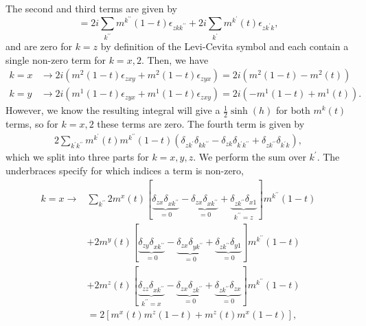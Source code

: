 \noindent The second and third terms are given by
\begin{equation*}
    =  2i\sum_{k^{\prime\prime}} m^{k^{\prime\prime}}(1-t)\epsilon_{zk k^{\prime\prime}} + 2i\sum_{k^{\prime}}  m^{k^{\prime}}(t)\epsilon_{zk^{\prime}k},
\end{equation*}
and are zero for $k=z$ by definition of the Levi-Cevita symbol and each contain a single non-zero term for $k=x,2$. Then, we have
\begin{align*}
    k=x & \rightarrow 2i\left( m^2(1-t)\epsilon_{zxy} + m^2(1-t)\epsilon_{zyx}\right) = 2i\left( m^2(1-t) - m^2(t)\right)\\
    k=y & \rightarrow 2i\left( m^1(1-t)\epsilon_{zyx} + m^1(1-t)\epsilon_{zxy}\right) = 2i\left( -m^1(1-t) + m^1(t)\right).
\end{align*}
However, we know the resulting integral will give a $\frac{1}{2}\sinh(h)$ for both $m^k(t)$ terms, so for $k=x,2$ these terms are zero.\newline
The fourth term is given by
\begin{align*}
    2\sum_{k^{\prime}k^{\prime\prime}} m^{k^{\prime}}(t) m^{k^{\prime\prime}}(1-t) (\delta_{zk^{\prime}}\delta_{kk^{\prime\prime}} - \delta_{zk}\delta_{k^{\prime}k^{\prime\prime}} + \delta_{zk^{\prime\prime}}\delta_{k^{\prime}k}),
\end{align*}
which we split into three parts for $k=x,y,z$. We perform the sum over $k^{\prime}$. The underbraces specify for which indices a term is non-zero,
\begin{align*}
    k=x \rightarrow  &\sum_{k^{\prime\prime}} 2m^{x}(t)[
    \underbrace{\delta_{zx}\delta_{xk^{\prime\prime}}}_{=0} - 
    \underbrace{\delta_{zx}\delta_{xk^{\prime\prime}}}_{=0} + 
    \underbrace{\delta_{zk^{\prime\prime}}\delta_{x1}}_{k^{\prime\prime}=z} ] m^{k^{\prime\prime}}(1-t) \\
    &+ 2m^{y}(t)[
    \underbrace{\delta_{zy}\delta_{xk^{\prime\prime}}}_{=0} - 
    \underbrace{\delta_{zx}\delta_{yk^{\prime\prime}}}_{=0} + 
    \underbrace{\delta_{zk^{\prime\prime}}\delta_{y1}}_{=0} ] m^{k^{\prime\prime}}(1-t)\\
    &+ 2m^{z}(t)[
    \underbrace{\delta_{zz}\delta_{xk^{\prime\prime}}}_{k^{\prime\prime}=x} - 
    \underbrace{\delta_{zx}\delta_{zk^{\prime\prime}}}_{=0} + 
    \underbrace{\delta_{zk^{\prime\prime}}\delta_{zx}}_{=0} ] m^{k^{\prime\prime}}(1-t)\\
    & = 2[m^{x}(t) m^{z}(1-t) + m^{z}(t) m^{x}(1-t)],
\end{align*}
